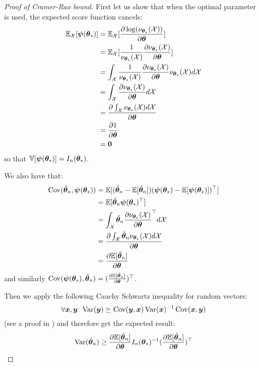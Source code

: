 \begin{proof}[Proof of Cramer-Rao bound]
  First let us show that when the optimal parameter is used, the expected score
  function cancels:
  \begin{align}
    \EE_{\Xcal}[\psib(\thetab_*)] 
    &= \EE_{\Xcal}[\partialfrac{\thetab}{\log(\nu_{\thetab_*}(\Xcal))}] \\
    &= \EE_{\Xcal}[\frac1{\nu_{\thetab_*}(\Xcal)}\partialfrac{\thetab}{\nu_{\thetab_*}(\Xcal)}] \\
    &= \int_{\Xcal} \frac1{\nu_{\thetab_*}(\Xcal)}\partialfrac{\thetab}{\nu_{\thetab_*}(\Xcal)} \nu_{\thetab_*}(\Xcal) d\Xcal \\
    &= \int_{\Xcal} \partialfrac{\thetab}{\nu_{\thetab_*}(\Xcal)} d\Xcal \\
    &= \partialfrac{\thetab}{\int_{\Xcal} \nu_{\thetab_*}(\Xcal)d\Xcal}  \\
    &= \partialfrac{\thetab}{1} \\
    &= \bzero
  \end{align}
  so that $\VV[\psib(\thetab_*)] = I_n(\thetab_*)$.

  We also have that:
  \begin{align}
    \Cov(\hat{\thetab}_n, \psib(\thetab_*)) &= \EE[ (\hat{\thetab}_n - \EE[\hat{\thetab}_n]) (\psib(\thetab_*) -  \EE[\psib(\thetab_*)])^{\top}]\\
                                           &= \EE[ \hat{\thetab}_n \psib(\thetab_*)^{\top}]\\
                                           &= \int_{\Xcal} \hat{\thetab}_n \partialfrac{\thetab}{\nu_{\thetab_*}(\Xcal)}^{\top} d\Xcal \\
                                           &= \partialfrac{\thetab}{\int_{\Xcal} \hat{\thetab}_n \nu_{\thetab_*}(\Xcal) d\Xcal} \\
                                           &= \partialfrac{\thetab}{\EE[\hat{\thetab}_n]}
  \end{align}
  and similarly $\Cov(\psib(\thetab_*), \hat{\thetab}_n) = (\partialfrac{\thetab}{\EE[\hat{\thetab}_n]})^{\top}$.

  Then we apply the following Cauchy Schwartz inequality for random vectors:
  \begin{equation}
  \forall \xb, \yb \enspace \Var(\yb) \succeq  \Cov(\yb, \xb) \Var(\xb)^{-1} \Cov(\xb, \yb)
  \end{equation}
(see a proof in \cite{tripathi1999matrix})
and therefore get the expected result:
  \begin{align}
    \Var(\hat{\thetab}_n) \geq  \partialfrac{\thetab}{\EE[\hat{\thetab}_n]} I_n(\thetab_*)^{-1} (\partialfrac{\thetab}{\EE[\hat{\thetab}_n]})^{\top} 
  \end{align}
\end{proof}

